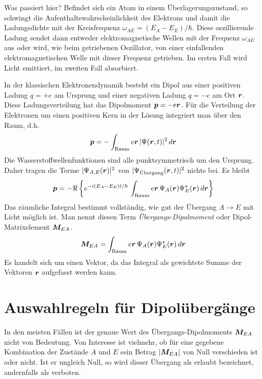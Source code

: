 Was passiert hier? Befindet sich ein Atom in einem Überlagerungszustand, so schwingt die Aufenthaltswahrscheinlichkeit des Elektrons und damit die Ladungsdichte mit der Kreisfrequenz $\omega_{AE} = (E_A - E_E) / \hbar $. Diese oszillierende Ladung sendet dann entweder elektromagnetische Wellen mit der Frequenz $\omega_{AE}$ aus oder wird, wie beim getriebenen Oszillator, von einer einfallenden elektromagnetischen Welle mit dieser Frequenz getrieben. Im ersten Fall wird Licht emittiert, im zweiten Fall absorbiert.

In der klassischen Elektronendynamik besteht ein Dipol aus einer positiven Ladung $q=+e$ am Ursprung und einer negativen Ladung $q=-e$ am Ort $\boldsymbol{r}$. Diese Ladungsverteilung hat das Dipolmoment $\boldsymbol{p} = -e \boldsymbol{r}$. Für die Verteilung der Elektronen um einen positiven Kern in der Lösung integriert man über den Raum, d.h. 
\begin{equation}
    \boldsymbol{p} = - \int_\text{Raum} e\boldsymbol{r} \,  | \Psi(\boldsymbol{r}, t) |^2 \, d \boldsymbol{r} 
\end{equation}
Die Wasserstoffwellenfunktionen sind alle punktsymmetrisch um den Ursprung. Daher tragen die Terme $ | \Psi_{A,E}(\boldsymbol{r})|^2$ von $| \Psi_\text{Übergang}(\boldsymbol{r},t)|^2$ nichts bei. Es bleibt 
\begin{equation}
    \boldsymbol{p} =  - \Re \left \{ e^{-i (E_A - E_E) t / \hbar}  \, \int_\text{Raum} e\boldsymbol{r} \,  \Psi_A(\boldsymbol{r})\Psi_E^\star(\boldsymbol{r})  \, d \boldsymbol{r} \right \}
\end{equation}
Das räumliche Integral bestimmt vollständig, wie gut der Übergang $A \rightarrow E$ mit Licht möglich ist. Man nennt diesen Term \emph{Übergangs-Dipolmoment} oder Dipol-Matrixelement $\boldsymbol{M}_{EA}$.
\begin{equation}
    \boldsymbol{M}_{EA} = \int_\text{Raum} e\boldsymbol{r} \,  \Psi_A(\boldsymbol{r})\Psi_E^\star(\boldsymbol{r})  \, d \boldsymbol{r} 
\end{equation}
Es handelt sich um einen Vektor, da das Integral als gewichtete Summe der Vektoren $\boldsymbol{r}$ aufgefasst werden kann.


\section{Auswahlregeln für Dipolübergänge}

In den meisten Fällen ist der genaue Wert des Übergangs-Dipolmoments $\boldsymbol{M}_{EA}$ nicht von Bedeutung. Von Interesse ist vielmehr, ob 
für eine gegebene Kombination der Zustände $A$ und $E$ sein Betrag $|\boldsymbol{M}_{EA}|$ von Null verschieden ist oder nicht. Ist er ungleich Null, so wird dieser Übergang als erlaubt bezeichnet, andernfalls als verboten. 

